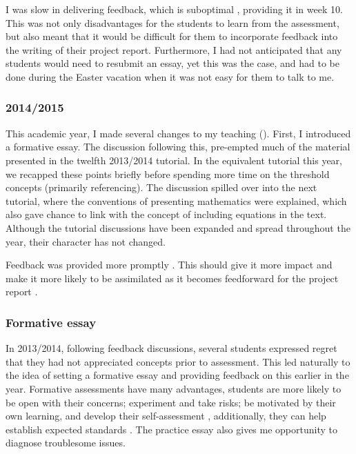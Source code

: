 I was slow in delivering feedback, which is suboptimal \citep[chapter 4, and references therein]{Irons2008}, providing it in week 10. This was not only disadvantages for the students to learn from the assessment, but also meant that it would be difficult for them to incorporate feedback into the writing of their project report. Furthermore, I had not anticipated that any students would need to resubmit an essay, yet this was the case, and had to be done during the Easter vacation when it was not easy for them to talk to me.

\subsubsection{2014/2015}\label{sec:teach2014-15}

This academic year, I made several changes to my teaching (). First, I introduced a formative essay. The discussion following this, pre-empted much of the material presented in the twelfth 2013/2014 tutorial. In the equivalent tutorial this year, we recapped these points briefly before spending more time on the threshold concepts (primarily referencing). The discussion spilled over into the next tutorial, where the conventions of presenting mathematics were explained, which also gave chance to link with the concept of including equations in the text. Although the tutorial discussions have been expanded and spread throughout the year, their character has not changed.

Feedback was provided more promptly \citep{Gibbs2015}. This should give it more impact and make it more likely to be assimilated as it becomes feedforward for the project report \citep{Housell2003,Bloxham2015}.

\subsubsection{Formative essay}\label{sec:formative}

In 2013/2014, following feedback discussions, several students expressed regret that they had not appreciated concepts prior to assessment. This led naturally to the idea of setting a formative essay and providing feedback on this earlier in the year. Formative assessments have many advantages, students are more likely to be open with their concerns; experiment and take risks; be motivated by their own learning, and develop their self-assessment \citep[chapter 1, and references therein]{Irons2008}, additionally, they can help establish expected standards \citep[chapter 10]{Ramsden1992}. The practice essay also gives me opportunity to diagnose troublesome issues.

